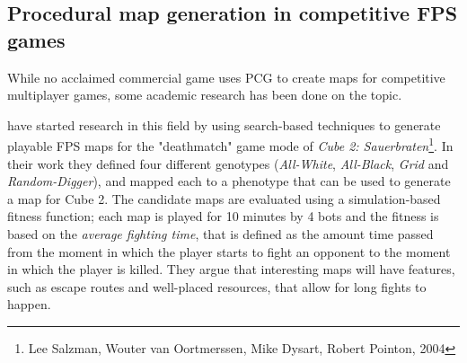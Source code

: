 \documentclass{Configuration_Files/PoliMi3i_thesis}
\begin{document}
\subsection{Procedural map generation in competitive FPS games}
\label{subsec:pcg_fps}
While no acclaimed commercial game uses PCG to create maps for competitive multiplayer games, some academic research has been done on the topic.

\citeauthor{cardamone_evolving_2011} have started research in this field by using search-based techniques to generate playable FPS maps for the "deathmatch" game mode of \textit{Cube 2: Sauerbraten}\footnote{Lee Salzman, Wouter van Oortmerssen, Mike Dysart, Robert Pointon, 2004}. In their work they defined four different genotypes (\textit{All-White}, \textit{All-Black}, \textit{Grid} and \textit{Random-Digger}), and mapped each to a phenotype that can be used to generate a map for Cube 2. The candidate maps are evaluated using a simulation-based fitness function; each map is played for 10 minutes by 4 bots and the fitness is based on the \textit{average fighting time}, that is defined as the amount time passed from the moment in which the player starts to fight an opponent to the moment in which the player is killed. They argue that interesting maps will have features, such as escape routes and well-placed resources, that allow for long fights to happen. \cite{cardamone_evolving_2011}
\end{document}
